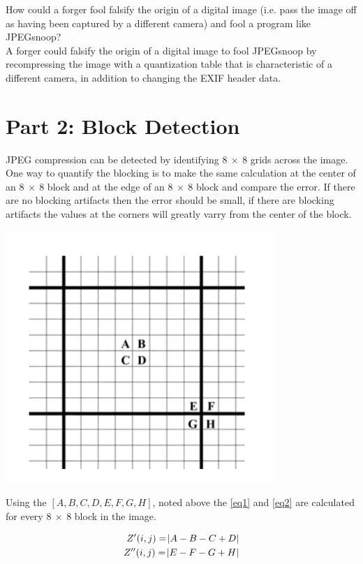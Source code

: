\documentclass{article}
\begin{document}
How could a forger fool falsify the origin of a digital image (i.e. pass the image off as having been captured by a different camera) and fool a program like JPEGsnoop?\\
A forger could falsify the origin of a digital image to fool JPEGsnoop
by recompressing the image with a quantization table that is
characteristic of a different camera, in addition to changing the EXIF
header data.

\section{Part 2: Block Detection}

\qquad JPEG compression can be detected by identifying $8 \ \times \ 8$
grids across the image. One way to quantify the blocking is to make the same
calculation at the center of an $8 \ \times \ 8$ block and at the edge of an
$8 \ \times \ 8$ block and compare the error. If there are no blocking
artifacts then the error should be small, if there are blocking artifacts
the values at the corners will greatly varry from the center of the block.

\includegraphics [width=4in]{block}

Using the $[A, B, C, D, E, F, G, H]$, noted above the \eqref{eq1} and
\eqref{eq2} are calculated
for every $8 \ \times \ 8$ block in the image.

\begin{align}
   Z'(i,j)=\abs{A-B-C+D}\label{eq1}\\
   Z''(i,j)=\abs{E-F-G+H}\label{eq2}
\end{align}
\end{document}
